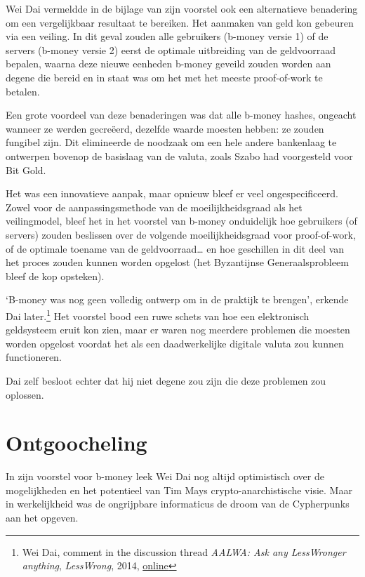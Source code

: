 \documentclass[
  a5paper,
  smalldemyvopaper,11pt,twoside,onecolumn,openright,extrafontsizes,
hidelinks]{memoir}
\begin{document}
Wei Dai vermeldde in de bijlage van zijn voorstel ook een alternatieve
benadering om een vergelijkbaar resultaat te bereiken. Het aanmaken van
geld kon gebeuren via een veiling. In dit geval zouden alle gebruikers
(b-money versie 1) of de servers (b-money versie 2) eerst de optimale
uitbreiding van de geldvoorraad bepalen, waarna deze nieuwe eenheden
b-money geveild zouden worden aan degene die bereid en in staat was om
het met het meeste proof-of-work te betalen.

Een grote voordeel van deze benaderingen was dat alle b-money hashes,
ongeacht wanneer ze werden gecreëerd, dezelfde waarde moesten hebben: ze
zouden fungibel zijn. Dit elimineerde de noodzaak om een hele andere
bankenlaag te ontwerpen bovenop de basislaag van de valuta, zoals Szabo
had voorgesteld voor Bit Gold.

Het was een innovatieve aanpak, maar opnieuw bleef er veel
ongespecificeerd. Zowel voor de aanpassingsmethode van de
moeilijkheidsgraad als het veilingmodel, bleef het in het voorstel van
b-money onduidelijk hoe gebruikers (of servers) zouden beslissen over de
volgende moeilijkheidsgraad voor proof-of-work, of de optimale toename
van de geldvoorraad\ldots{} en hoe geschillen in dit deel van het proces
zouden kunnen worden opgelost (het Byzantijnse Generaalsprobleem bleef
de kop opsteken).

`B-money was nog geen volledig ontwerp om in de praktijk te brengen',
erkende Dai later.\footnote{Wei Dai, comment in the discussion thread
  \emph{AALWA: Ask any LessWronger anything}, \emph{LessWrong}, 2014,
  \href{https://www.lesswrong.com/posts/YdfpDyRpNyypivgdu/aalwa-ask-any-lesswronger-anything}{online}}
Het voorstel bood een ruwe schets van hoe een elektronisch geldsysteem
eruit kon zien, maar er waren nog meerdere problemen die moesten worden
opgelost voordat het als een daadwerkelijke digitale valuta zou kunnen
functioneren.

Dai zelf besloot echter dat hij niet degene zou zijn die deze problemen
zou oplossen.

\section{Ontgoocheling}\label{ontgoocheling}

In zijn voorstel voor b-money leek Wei Dai nog altijd optimistisch over
de mogelijkheden en het potentieel van Tim Mays crypto-anarchistische
visie. Maar in werkelijkheid was de ongrijpbare informaticus de droom
van de Cypherpunks aan het opgeven.
\end{document}
